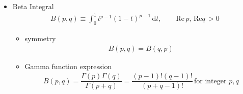 \begin{itemize}[topsep=2pt,itemsep=0pt]
    
    \item Beta Integral 
    \begin{align*}
        B(p,q)\equiv \int_0^1 t^{p-1}(1-t)^{p-1}\,\mathrm{d}t,\qquad  \mathrm{Re}\,p,\,\mathrm{Re}q \,>0
    \end{align*}
    \begin{itemize}[topsep=2pt,itemsep=0pt]
        \item symmetry
        \begin{align*}
            B(p,q)=B(q,p) 
        \end{align*}
        \item Gamma function expression
        \begin{align*}
            B(p,q)=\dfrac{\Gamma (p)\Gamma (q)}{\Gamma (p+q)}=\dfrac{(p-1)!(q-1)!}{(p+q-1)!}\,\text{for integer }p,q 
        \end{align*}
        
    \end{itemize} 
    
    
\end{itemize}

    

